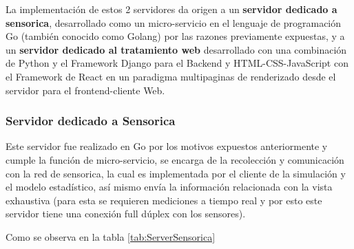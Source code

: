     La implementación de estos 2 servidores da origen a un \textbf{servidor dedicado
    a sensorica}, desarrollado como un micro-servicio en el lenguaje de programación
    Go (también conocido como Golang) por las razones previamente expuestas, y
    a un \textbf{servidor dedicado al tratamiento web} desarrollado con una
    combinación de Python y el Framework Django para el Backend y HTML-CSS-JavaScript
    con el Framework de React en un paradigma multipaginas de renderizado desde
    el servidor para el frontend-cliente Web.

    \subsubsection{Servidor dedicado a Sensorica}

    Este servidor fue realizado en Go por los motivos expuestos anteriormente y
    cumple la función de micro-servicio, se encarga de la recolección y comunicación
    con la red de sensorica, la cual es implementada por el cliente de la simulación
    y el modelo estadístico, así mismo envía la información relacionada con la
    vista exhaustiva (para esta se requieren mediciones a tiempo real y por esto
    este servidor tiene una conexión full dúplex con los sensores).

    Como se observa en la tabla \ref{tab:ServerSensorica}


